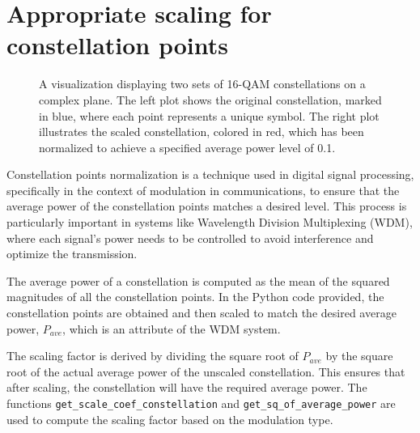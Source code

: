 \section{Appropriate scaling for constellation points}
\label{sec:scaling}

\begin{figure}[h]
    \caption{A visualization displaying two sets of 16-QAM constellations on a complex plane. The left plot shows the original constellation, marked in blue, where each point represents a unique symbol. The right plot illustrates the scaled constellation, colored in red, which has been normalized to achieve a specified average power level of 0.1.}
    \label{fig:constellation_scale}
\end{figure}

Constellation points normalization is a technique used in digital signal processing, specifically in the context of modulation in communications, to ensure that the average power of the constellation points matches a desired level. This process is particularly important in systems like Wavelength Division Multiplexing (WDM), where each signal's power needs to be controlled to avoid interference and optimize the transmission.

The average power of a constellation is computed as the mean of the squared magnitudes of all the constellation points. In the Python code provided, the constellation points are obtained and then scaled to match the desired average power, $P_{ave}$, which is an attribute of the WDM system.

The scaling factor is derived by dividing the square root of $P_{ave}$ by the square root of the actual average power of the unscaled constellation. This ensures that after scaling, the constellation will have the required average power. The functions \texttt{get\_scale\_coef\_constellation} and \texttt{get\_sq\_of\_average\_power} are used to compute the scaling factor based on the modulation type.

